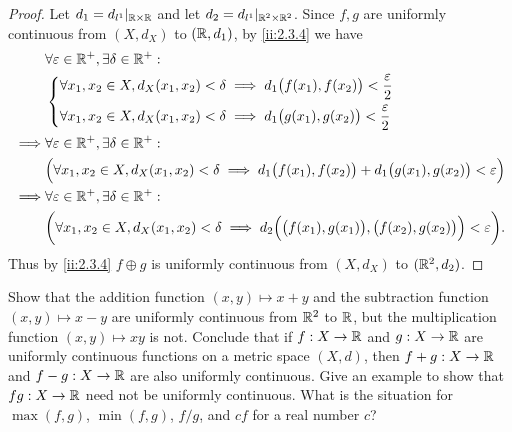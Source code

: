 \begin{proof}
  Let \(d_1 = d_{l^1}|_{\mathbb{R} \times \mathbb{R}}\) and let \(d_2 = d_{l^1}|_{\mathbb{R}^2 \times \mathbb{R}^2}\).
  Since \(f, g\) are uniformly continuous from \((X, d_X)\) to \((\mathbb{R}, d_1)\), by \cref{ii:2.3.4} we have
  \begin{align*}
             & \forall \varepsilon \in \mathbb{R}^+, \exists \delta \in \mathbb{R}^+ :                                                                                            \\
             & \begin{dcases}
                 \forall x_1, x_2 \in X, d_X(x_1, x_2) < \delta \implies d_1\big(f(x_1), f(x_2)\big) < \dfrac{\varepsilon}{2} \\
                 \forall x_1, x_2 \in X, d_X(x_1, x_2) < \delta \implies d_1\big(g(x_1), g(x_2)\big) < \dfrac{\varepsilon}{2}
               \end{dcases}                                       \\
    \implies & \forall \varepsilon \in \mathbb{R}^+, \exists \delta \in \mathbb{R}^+ :                                                                                            \\
             & \Big(\forall x_1, x_2 \in X, d_X(x_1, x_2) < \delta \implies d_1\big(f(x_1), f(x_2)\big) + d_1\big(g(x_1), g(x_2)\big) < \varepsilon\Big)          \\
    \implies & \forall \varepsilon \in \mathbb{R}^+, \exists \delta \in \mathbb{R}^+ :                                                                                            \\
             & \bigg(\forall x_1, x_2 \in X, d_X(x_1, x_2) < \delta \implies d_2\Big(\big(f(x_1), g(x_1)\big), \big(f(x_2), g(x_2)\big)\Big) < \varepsilon\bigg).
  \end{align*}
  Thus by \cref{ii:2.3.4} \(f \oplus g\) is uniformly continuous from \((X, d_X)\) to \((\mathbb{R}^2, d_2)\).
\end{proof}

\begin{ex}\label{ii:ex:2.3.6}
  Show that the addition function \((x, y) \mapsto x + y\) and the subtraction function \((x, y) \mapsto x - y\) are uniformly continuous from \(\mathbb{R}^2\) to \(\mathbb{R}\), but the multiplication function \((x, y) \mapsto xy\) is not.
  Conclude that if \(f : X \to \mathbb{R}\) and \(g : X \to \mathbb{R}\) are uniformly continuous functions on a metric space \((X, d)\), then \(f + g : X \to \mathbb{R}\) and \(f - g : X \to \mathbb{R}\) are also uniformly continuous.
  Give an example to show that \(fg : X \to \mathbb{R}\) need not be uniformly continuous.
  What is the situation for \(\max(f, g)\), \(\min(f, g)\), \(f / g\), and \(cf\) for a real number \(c\)?
\end{ex}

